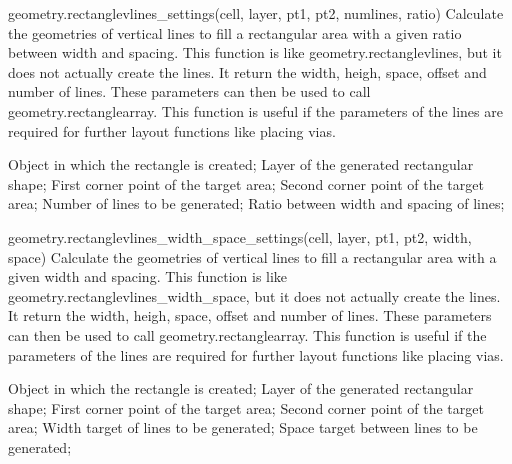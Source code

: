 \begin{APIfunc}{geometry.rectanglevlines\_settings(cell, layer, pt1, pt2, numlines, ratio)}
    Calculate the geometries of vertical lines to fill a rectangular area with a given ratio between width and spacing. This function is like geometry.rectanglevlines, but it does not actually create the lines. It return the width, heigh, space, offset and number of lines. These parameters can then be used to call geometry.rectanglearray. This function is useful if the parameters of the lines are required for further layout functions like placing vias.
    \begin{APIparameters}
            Object in which the rectangle is created;
            Layer of the generated rectangular shape;
            First corner point of the target area;
            Second corner point of the target area;
            Number of lines to be generated;
            Ratio between width and spacing of lines;
    \end{APIparameters}
\end{APIfunc}
\begin{APIfunc}{geometry.rectanglevlines\_width\_space\_settings(cell, layer, pt1, pt2, width, space)}
    Calculate the geometries of vertical lines to fill a rectangular area with a given width and spacing. This function is like geometry.rectanglevlines\_width\_space, but it does not actually create the lines. It return the width, heigh, space, offset and number of lines. These parameters can then be used to call geometry.rectanglearray. This function is useful if the parameters of the lines are required for further layout functions like placing vias.
    \begin{APIparameters}
            Object in which the rectangle is created;
            Layer of the generated rectangular shape;
            First corner point of the target area;
            Second corner point of the target area;
            Width target of lines to be generated;
            Space target between lines to be generated;
    \end{APIparameters}
\end{APIfunc}
